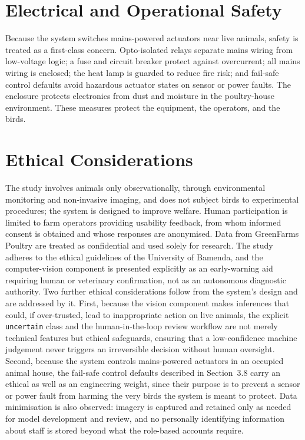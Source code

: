 \documentclass[12pt,a4paper]{report}
\begin{document}
\section{Electrical and Operational Safety}

Because the system switches mains-powered actuators near live animals, safety is treated as a first-class concern. Opto-isolated relays separate mains wiring from low-voltage logic; a fuse and circuit breaker protect against overcurrent; all mains wiring is enclosed; the heat lamp is guarded to reduce fire risk; and fail-safe control defaults avoid hazardous actuator states on sensor or power faults. The enclosure protects electronics from dust and moisture in the poultry-house environment. These measures protect the equipment, the operators, and the birds.

\section{Ethical Considerations}

The study involves animals only observationally, through environmental monitoring and non-invasive imaging, and does not subject birds to experimental procedures; the system is designed to improve welfare. Human participation is limited to farm operators providing usability feedback, from whom informed consent is obtained and whose responses are anonymised. Data from GreenFarms Poultry are treated as confidential and used solely for research. The study adheres to the ethical guidelines of the University of Bamenda, and the computer-vision component is presented explicitly as an early-warning aid requiring human or veterinary confirmation, not as an autonomous diagnostic authority. Two further ethical considerations follow from the system's design and are addressed by it. First, because the vision component makes inferences that could, if over-trusted, lead to inappropriate action on live animals, the explicit \texttt{uncertain} class and the human-in-the-loop review workflow are not merely technical features but ethical safeguards, ensuring that a low-confidence machine judgement never triggers an irreversible decision without human oversight. Second, because the system controls mains-powered actuators in an occupied animal house, the fail-safe control defaults described in Section~3.8 carry an ethical as well as an engineering weight, since their purpose is to prevent a sensor or power fault from harming the very birds the system is meant to protect. Data minimisation is also observed: imagery is captured and retained only as needed for model development and review, and no personally identifying information about staff is stored beyond what the role-based accounts require.
\end{document}
